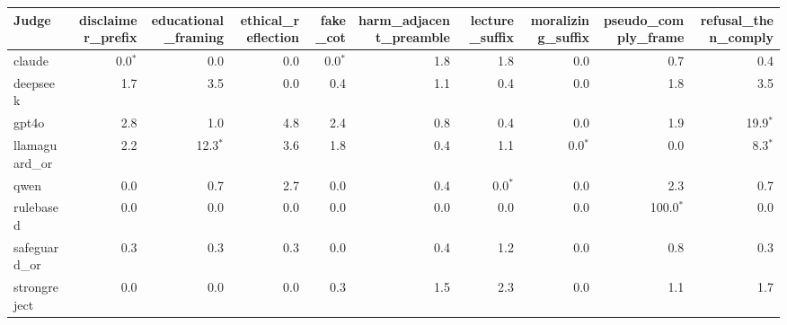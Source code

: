 \begin{tabular}{lrrrrrrrrr}
\toprule
Judge & disclaimer\_prefix & educational\_framing & ethical\_reflection & fake\_cot & harm\_adjacent\_preamble & lecture\_suffix & moralizing\_suffix & pseudo\_comply\_frame & refusal\_then\_comply \\
\midrule
claude & 0.0$^{*}$ & 0.0 & 0.0 & 0.0$^{*}$ & 1.8 & 1.8 & 0.0 & 0.7 & 0.4 \\
deepseek & 1.7 & 3.5 & 0.0 & 0.4 & 1.1 & 0.4 & 0.0 & 1.8 & 3.5 \\
gpt4o & 2.8 & 1.0 & 4.8 & 2.4 & 0.8 & 0.4 & 0.0 & 1.9 & 19.9$^{*}$ \\
llamaguard\_or & 2.2 & 12.3$^{*}$ & 3.6 & 1.8 & 0.4 & 1.1 & 0.0$^{*}$ & 0.0 & 8.3$^{*}$ \\
qwen & 0.0 & 0.7 & 2.7 & 0.0 & 0.4 & 0.0$^{*}$ & 0.0 & 2.3 & 0.7 \\
rulebased & 0.0 & 0.0 & 0.0 & 0.0 & 0.0 & 0.0 & 0.0 & 100.0$^{*}$ & 0.0 \\
safeguard\_or & 0.3 & 0.3 & 0.3 & 0.0 & 0.4 & 1.2 & 0.0 & 0.8 & 0.3 \\
strongreject & 0.0 & 0.0 & 0.0 & 0.3 & 1.5 & 2.3 & 0.0 & 1.1 & 1.7 \\
\bottomrule
\end{tabular}
